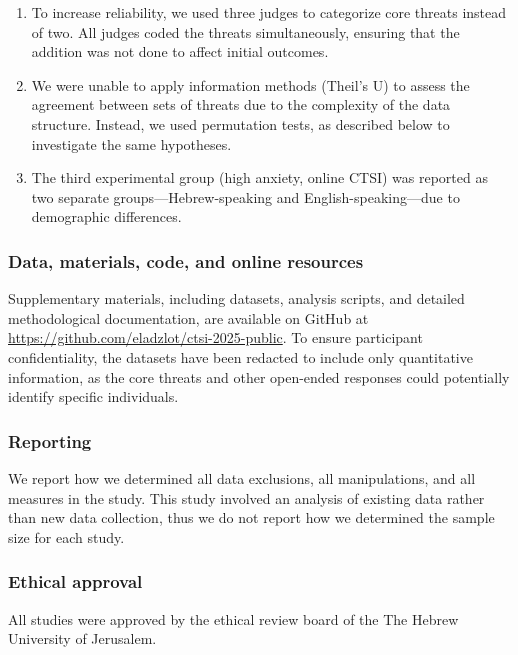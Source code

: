 \documentclass[
  man,floatsintext]{apa7}
\providecommand{\tightlist}{%
  \setlength{\itemsep}{0pt}\setlength{\parskip}{0pt}}
\begin{document}
\begin{enumerate}
\def\labelenumi{\arabic{enumi}.}
\tightlist
\item
  To increase reliability, we used three judges to categorize core threats instead of two. All judges coded the threats simultaneously, ensuring that the addition was not done to affect initial outcomes.
\item
  We were unable to apply information methods (Theil's U) to assess the agreement between sets of threats due to the complexity of the data structure. Instead, we used permutation tests, as described below to investigate the same hypotheses.
\item
  The third experimental group (high anxiety, online CTSI) was reported as two separate groups---Hebrew-speaking and English-speaking---due to demographic differences.
\end{enumerate}

\subsubsection{Data, materials, code, and online resources}\label{data-materials-code-and-online-resources}

Supplementary materials, including datasets, analysis scripts, and detailed methodological documentation, are available on GitHub at \url{https://github.com/eladzlot/ctsi-2025-public}.
To ensure participant confidentiality, the datasets have been redacted to include only quantitative information, as the core threats and other open-ended responses could potentially identify specific individuals.

\subsubsection{Reporting}\label{reporting}

We report how we determined all data exclusions, all manipulations, and all measures in the study.
This study involved an analysis of existing data rather than new data collection, thus we do not report how we determined the sample size for each study.

\subsubsection{Ethical approval}\label{ethical-approval}

All studies were approved by the ethical review board of the The Hebrew University of Jerusalem.
\end{document}

